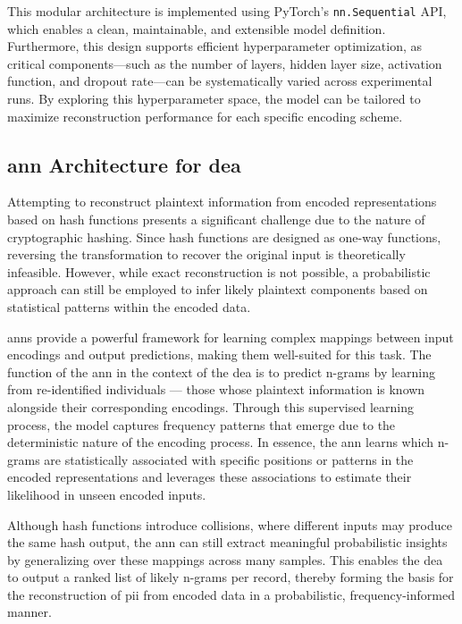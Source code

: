 This modular architecture is implemented using PyTorch's \texttt{nn.Sequential} API, which enables a clean, maintainable, and extensible model definition.
Furthermore, this design supports efficient hyperparameter optimization, as critical components—such as the number of layers, hidden layer size, activation function, and dropout rate—can be systematically varied across experimental runs.
By exploring this hyperparameter space, the model can be tailored to maximize reconstruction performance for each specific encoding scheme.

\subsection{\ac{ann} Architecture for \ac{dea}} \label{sec:architecture}

Attempting to reconstruct plaintext information from encoded representations based on hash functions presents a significant challenge due to the nature of cryptographic hashing.
Since hash functions are designed as one-way functions, reversing the transformation to recover the original input is theoretically infeasible.
However, while exact reconstruction is not possible, a probabilistic approach can still be employed to infer likely plaintext components based on statistical patterns within the encoded data.

\ac{ann}s provide a powerful framework for learning complex mappings between input encodings and output predictions, making them well-suited for this task.
The function of the \ac{ann} in the context of the \ac{dea} is to predict n-grams by learning from re-identified individuals — those whose plaintext information is known alongside their corresponding encodings.
Through this supervised learning process, the model captures frequency patterns that emerge due to the deterministic nature of the encoding process.
In essence, the \ac{ann} learns which n-grams are statistically associated with specific positions or patterns in the encoded representations and leverages these associations to estimate their likelihood in unseen encoded inputs.

Although hash functions introduce collisions, where different inputs may produce the same hash output, the \ac{ann} can still extract meaningful probabilistic insights by generalizing over these mappings across many samples.
This enables the \ac{dea} to output a ranked list of likely n-grams per record, thereby forming the basis for the reconstruction of \ac{pii} from encoded data in a probabilistic, frequency-informed manner.

